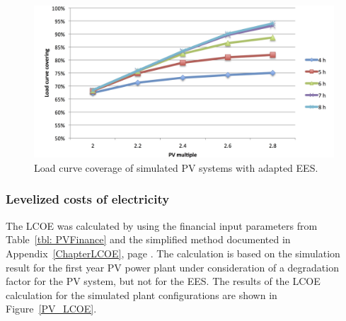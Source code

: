 \begin{figure}[htbp]  
\centering
\includegraphics[width=1\linewidth]{FIG/PV_LCCF}
\caption[Load curve coverage of simulated PV systems with adapted EES.]{Load curve coverage of simulated PV systems with adapted EES.}\label{PV_LCCF}
\end{figure}
\pagebreak
\subsubsection{Levelized costs of electricity}


The LCOE was calculated by using the financial input parameters from Table~\ref{tbl: PVFinance} and the simplified method documented in Appendix~\ref{ChapterLCOE}, page \pageref{ChapterLCOE}. The calculation is based on the simulation result for the first year PV power plant under consideration of a degradation factor for the PV system, but not for the EES. The results of the LCOE calculation for the simulated plant configurations are shown in Figure~\ref{PV_LCOE}. 


